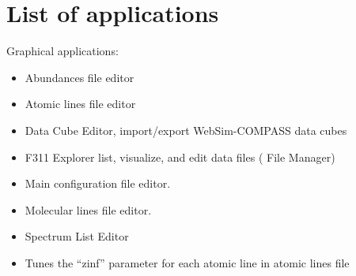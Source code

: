 \documentclass[letterpaper,10pt,english]{sphinxmanual}
\begin{document}
\section{List of applications}
\label{\detokenize{explorer:list-of-applications}}
\begin{sphinxVerbatim}[commandchars=\\\{\}]
  
\end{sphinxVerbatim}

Graphical applications:
\begin{itemize}
\item {} 
 \textendash{} Abundances file editor

\item {} 
 \textendash{} Atomic lines file editor

\item {} 
 \textendash{} Data Cube Editor, import/export WebSim-COMPASS data cubes

\item {} 
 \textendash{} F311 Explorer \textendash{}  list, visualize, and edit data files ( File Manager)

\item {} 
 \textendash{} Main configuration file editor.

\item {} 
 \textendash{} Molecular lines file editor.

\item {} 
 \textendash{} Spectrum List Editor

\item {} 
 \textendash{} Tunes the “zinf” parameter for each atomic line in atomic lines file

\end{itemize}
\end{document}
